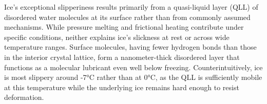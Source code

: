 Ice's exceptional slipperiness results primarily from a quasi-liquid layer (QLL) of disordered water molecules at its surface rather than from commonly assumed mechanisms. While pressure melting and frictional heating contribute under specific conditions, neither explains ice's slickness at rest or across wide temperature ranges. Surface molecules, having fewer hydrogen bonds than those in the interior crystal lattice, form a nanometer-thick disordered layer that functions as a molecular lubricant even well below freezing. Counterintuitively, ice is most slippery around -7°C rather than at 0°C, as the QLL is sufficiently mobile at this temperature while the underlying ice remains hard enough to resist deformation.
